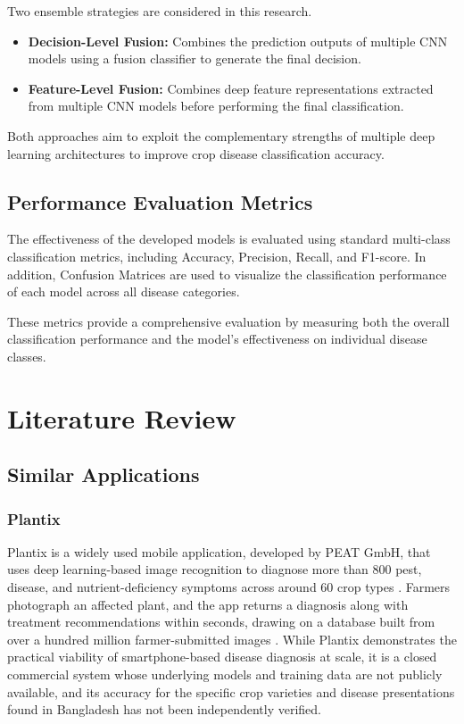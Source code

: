 Two ensemble strategies are considered in this research.

\begin{itemize}
    \item \textbf{Decision-Level Fusion:} Combines the prediction outputs of multiple CNN models using a fusion classifier to generate the final decision.
    \item \textbf{Feature-Level Fusion:} Combines deep feature representations extracted from multiple CNN models before performing the final classification.
\end{itemize}

Both approaches aim to exploit the complementary strengths of multiple deep learning architectures to improve crop disease classification accuracy.

\subsection{Performance Evaluation Metrics}

The effectiveness of the developed models is evaluated using standard multi-class classification metrics, including Accuracy, Precision, Recall, and F1-score. In addition, Confusion Matrices are used to visualize the classification performance of each model across all disease categories.

These metrics provide a comprehensive evaluation by measuring both the overall classification performance and the model's effectiveness on individual disease classes.

\section{Literature Review}

\subsection{Similar Applications}

\subsubsection{Plantix}
Plantix is a widely used mobile application, developed by PEAT GmbH, that uses deep learning-based image recognition to diagnose more than 800 pest, disease, and nutrient-deficiency symptoms across around 60 crop types \cite{plantix_gsma}. Farmers photograph an affected plant, and the app returns a diagnosis along with treatment recommendations within seconds, drawing on a database built from over a hundred million farmer-submitted images \cite{plantix_gsma}. While Plantix demonstrates the practical viability of smartphone-based disease diagnosis at scale, it is a closed commercial system whose underlying models and training data are not publicly available, and its accuracy for the specific crop varieties and disease presentations found in Bangladesh has not been independently verified.

